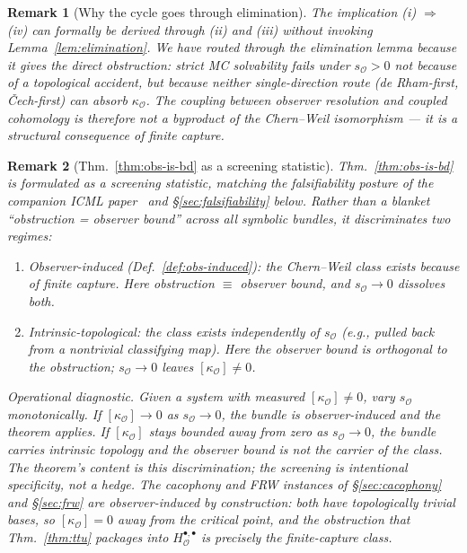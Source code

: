 \documentclass[11pt]{article}
\newtheorem{remark}{Remark}
\newcommand{\Obs}{\mathcal{O}}
\newcommand{\kappaO}{\kappa_{\Obs}}
\newcommand{\rmin}{s_{\Obs}}
\newcommand{\HO}{H_\Obs}
\begin{document}
\begin{remark}[Why the cycle goes through elimination]
\label{rem:why-elim}
The implication (i) $\Rightarrow$ (iv) can formally be derived
through (ii) and (iii) without invoking
Lemma~\ref{lem:elimination}. We have routed through the
elimination lemma because it gives the \emph{direct} obstruction:
strict MC solvability fails under $\rmin > 0$ not because of a
topological accident, but because neither single-direction route
(de Rham-first, \v{C}ech-first) can absorb $\kappaO$. The coupling
between observer resolution and coupled cohomology is therefore
not a byproduct of the Chern--Weil isomorphism --- it is a
structural consequence of finite capture.
\end{remark}

\begin{remark}[Thm.~\ref{thm:obs-is-bd} as a screening statistic]
\label{rem:screening}
Thm.~\ref{thm:obs-is-bd} is formulated as a
\emph{screening statistic}, matching the falsifiability posture
of the companion ICML paper~\cite{tiffany2026cacophony} and
§\ref{sec:falsifiability} below. Rather than a blanket
``obstruction = observer bound'' across all symbolic bundles,
it discriminates two regimes:
\begin{enumerate}[label=(\alph*),leftmargin=*,itemsep=2pt]
\item \emph{Observer-induced} (Def.~\ref{def:obs-induced}): the
Chern--Weil class exists \emph{because of} finite capture. Here
obstruction $\equiv$ observer bound, and $\rmin \to 0$ dissolves
both.
\item \emph{Intrinsic-topological}: the class exists
independently of $\rmin$ (e.g., pulled back from a nontrivial
classifying map). Here the observer bound is orthogonal to the
obstruction; $\rmin \to 0$ leaves $[\kappaO] \neq 0$.
\end{enumerate}

\smallskip\noindent\emph{Operational diagnostic.}
Given a system with measured $[\kappaO] \neq 0$, vary $\rmin$
monotonically. If $[\kappaO] \to 0$ as $\rmin \to 0$, the bundle
is observer-induced and the theorem applies. If $[\kappaO]$
stays bounded away from zero as $\rmin \to 0$, the bundle carries
intrinsic topology and the observer bound is not the carrier of
the class. The theorem's content is this discrimination; the
screening is intentional specificity, not a hedge. The
cacophony and FRW instances of \S\ref{sec:cacophony} and
\S\ref{sec:frw} are observer-induced by construction: both have
topologically trivial bases, so $[\kappaO] = 0$ away from the
critical point, and the obstruction that Thm.~\ref{thm:ttu}
packages into $\HO^{\bullet, \bullet}$ is precisely the
finite-capture class.
\end{remark}
\end{document}
